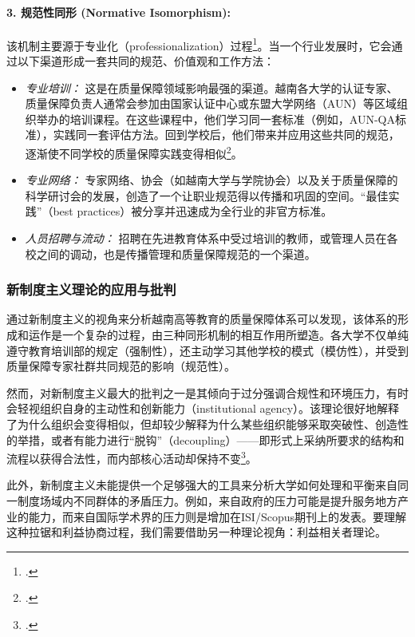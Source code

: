 \paragraph{3. 规范性同形 (Normative Isomorphism):}
该机制主要源于专业化（professionalization）过程\footcite{DiMaggioPowell1983}。当一个行业发展时，它会通过以下渠道形成一套共同的规范、价值观和工作方法：
\begin{itemize}
    \item \textit{专业培训：} 这是在质量保障领域影响最强的渠道。越南各大学的认证专家、质量保障负责人通常会参加由国家认证中心或东盟大学网络（AUN）等区域组织举办的培训课程。在这些课程中，他们学习同一套标准（例如，AUN-QA标准），实践同一套评估方法。回到学校后，他们带来并应用这些共同的规范，逐渐使不同学校的质量保障实践变得相似\footcite{AUN-QAGuide}。
    \item \textit{专业网络：} 专家网络、协会（如越南大学与学院协会）以及关于质量保障的科学研讨会的发展，创造了一个让职业规范得以传播和巩固的空间。“最佳实践”（best practices）被分享并迅速成为全行业的非官方标准。
    \item \textit{人员招聘与流动：} 招聘在先进教育体系中受过培训的教师，或管理人员在各校之间的调动，也是传播管理和质量保障规范的一个渠道。
\end{itemize}

\subsubsection{新制度主义理论的应用与批判}

通过新制度主义的视角来分析越南高等教育的质量保障体系可以发现，该体系的形成和运作是一个复杂的过程，由三种同形机制的相互作用所塑造。各大学不仅单纯遵守教育培训部的规定（强制性），还主动学习其他学校的模式（模仿性），并受到质量保障专家社群共同规范的影响（规范性）。

然而，对新制度主义最大的批判之一是其倾向于过分强调合规性和环境压力，有时会轻视组织自身的主动性和创新能力（institutional agency）。该理论很好地解释了为什么组织会变得相似，但却较少解释为什么某些组织能够采取突破性、创造性的举措，或者有能力进行“脱钩”（decoupling）——即形式上采纳所要求的结构和流程以获得合法性，而内部核心活动却保持不变\footcite{MeyerRowan1977}。

此外，新制度主义未能提供一个足够强大的工具来分析大学如何处理和平衡来自同一制度场域内不同群体的矛盾压力。例如，来自政府的压力可能是提升服务地方产业的能力，而来自国际学术界的压力则是增加在ISI/Scopus期刊上的发表。要理解这种拉锯和利益协商过程，我们需要借助另一种理论视角：利益相关者理论。

